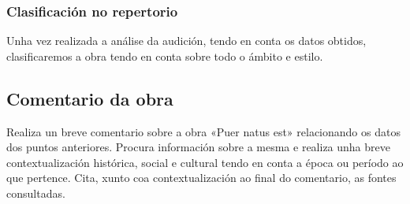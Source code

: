 \subsubsection*{Clasificación no repertorio} 
Unha vez realizada a análise da audición, tendo en conta os datos obtidos, clasificaremos a obra tendo en conta sobre todo o ámbito e estilo.
%
\subsection*{Comentario da obra}\label{subsec:comentario-puer-natus}
%
Realiza un breve comentario sobre a obra «Puer natus est» relacionando os datos dos puntos anteriores. Procura información sobre a mesma e realiza unha breve contextualización histórica, social e cultural tendo en conta a época ou período ao que pertence. Cita, xunto coa contextualización ao final do comentario, as fontes consultadas.
%
%
\vspace*{0.5cm}
\begin{ejercicio}

%

        \vspace*{15.78cm}
\end{ejercicio}

